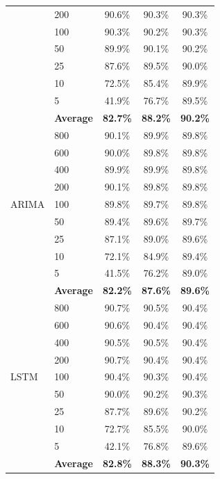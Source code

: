 \documentclass[11pt,a4paper]{article}
\begin{document}
\begin{table}[H]
\begin{tabular}{llccc}
 & 200 & 90.6\% & 90.3\% & 90.3\% \\
 & 100 & 90.3\% & 90.2\% & 90.3\% \\
 & 50  & 89.9\% & 90.1\% & 90.2\% \\
 & 25  & 87.6\% & 89.5\% & 90.0\% \\
 & 10  & 72.5\% & 85.4\% & 89.9\% \\
 & 5   & 41.9\% & 76.7\% & 89.5\% \\
 & \textbf{Average} & \textbf{82.7\%} & \textbf{88.2\%} & \textbf{90.2\%} \\
\midrule
\multirow{9}{*}{ARIMA}
 & 800 & 90.1\% & 89.9\% & 89.8\% \\
 & 600 & 90.0\% & 89.8\% & 89.8\% \\
 & 400 & 89.9\% & 89.9\% & 89.8\% \\
 & 200 & 90.1\% & 89.8\% & 89.8\% \\
 & 100 & 89.8\% & 89.7\% & 89.8\% \\
 & 50  & 89.4\% & 89.6\% & 89.7\% \\
 & 25  & 87.1\% & 89.0\% & 89.6\% \\
 & 10  & 72.1\% & 84.9\% & 89.4\% \\
 & 5   & 41.5\% & 76.2\% & 89.0\% \\
 & \textbf{Average} & \textbf{82.2\%} & \textbf{87.6\%} & \textbf{89.6\%} \\
\midrule
\multirow{9}{*}{LSTM}
 & 800 & 90.7\% & 90.5\% & 90.4\% \\
 & 600 & 90.6\% & 90.4\% & 90.4\% \\
 & 400 & 90.5\% & 90.5\% & 90.4\% \\
 & 200 & 90.7\% & 90.4\% & 90.4\% \\
 & 100 & 90.4\% & 90.3\% & 90.4\% \\
 & 50  & 90.0\% & 90.2\% & 90.3\% \\
 & 25  & 87.7\% & 89.6\% & 90.2\% \\
 & 10  & 72.7\% & 85.5\% & 90.0\% \\
 & 5   & 42.1\% & 76.8\% & 89.6\% \\
 & \textbf{Average} & \textbf{82.8\%} & \textbf{88.3\%} & \textbf{90.3\%} \\
\bottomrule
\end{tabular}
\end{table}
\end{document}

